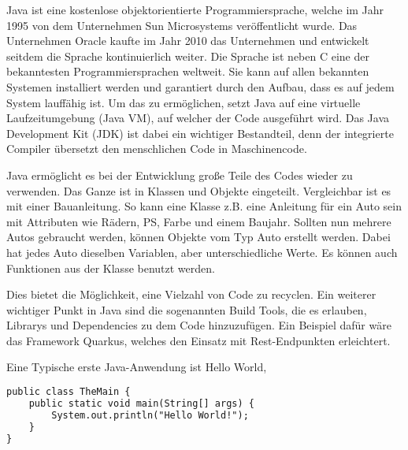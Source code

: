 Java ist eine kostenlose objektorientierte Programmiersprache, welche im Jahr 1995 von dem Unternehmen Sun Microsystems veröffentlicht wurde. Das Unternehmen Oracle kaufte im Jahr 2010 das Unternehmen und entwickelt seitdem die Sprache kontinuierlich weiter. Die Sprache ist neben C eine der bekanntesten Programmiersprachen weltweit. Sie kann auf allen bekannten Systemen installiert werden und garantiert durch den Aufbau, dass es auf jedem System lauffähig ist. Um das zu ermöglichen, setzt Java auf eine virtuelle Laufzeitumgebung (Java VM), auf welcher der Code ausgeführt wird. Das Java Development Kit (JDK) ist dabei ein wichtiger Bestandteil, denn der integrierte Compiler übersetzt den menschlichen Code in Maschinencode.

Java ermöglicht es bei der Entwicklung große Teile des Codes wieder zu verwenden. Das Ganze ist in Klassen und Objekte eingeteilt. Vergleichbar ist es mit einer Bauanleitung. So kann eine Klasse z.B. eine Anleitung für ein Auto sein mit Attributen wie Rädern, PS, Farbe und einem Baujahr. Sollten nun mehrere Autos gebraucht werden, können Objekte vom Typ Auto erstellt werden. Dabei hat jedes Auto dieselben Variablen, aber unterschiedliche Werte. Es können auch Funktionen aus der Klasse benutzt werden.

Dies bietet die Möglichkeit, eine Vielzahl von Code zu recyclen. Ein weiterer wichtiger Punkt in Java sind die sogenannten Build Tools, die es erlauben, Librarys und Dependencies zu dem Code hinzuzufügen. Ein Beispiel dafür wäre das Framework Quarkus, welches den Einsatz mit Rest-Endpunkten erleichtert.


\cite{javaOracle}
\cite{javaJava}
\cite{javaHegelit}
\cite{javaWikipedia}


Eine Typische erste Java-Anwendung ist Hello World,

\begin{lstlisting}[language=HTML,caption=Hello World,label=lst:impl:HelloWorld]
    public class TheMain {
    public static void main(String[] args) {
        System.out.println("Hello World!");
    }
}
  \end{lstlisting}